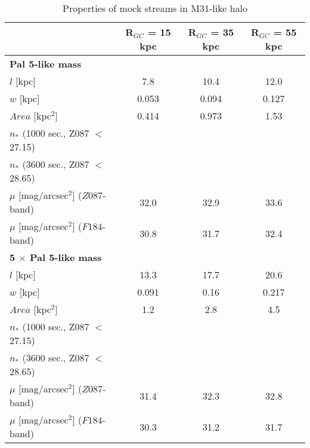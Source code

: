 \documentclass[twocolumn]{aastex62}
\begin{document}

\begin{table*}
\centering
\caption{Properties of mock streams in M31-like halo}
\label{tab:Pal5}
\begin{tabular}{lccc}
\hline
 & {\bf R$_{GC}$ = 15 kpc }&  {\bf R$_{GC}$ = 35 kpc} &  {\bf R$_{GC}$ = 55 kpc} \\ 
 \hline
{\bf Pal 5-like mass} & &&\\
$l$ [kpc] & 7.8 & 10.4 &  12.0  \\
$w$ [kpc] & 0.053 & 0.094  & 0.127  \\
$Area$ [kpc$^2$] & 0.414 & 0.973 &1.53 \\
$n_*$ (1000 sec., Z087 $<$ 27.15) & & \\
$n_*$ (3600 sec., Z087 $<$ 28.65) & & \\
$\mu$ [mag/arcsec$^2$] ($Z087$-band) &32.0 &32.9 &33.6  \\
$\mu$ [mag/arcsec$^2$] ($F184$-band) &30.8 &31.7 &32.4  \\

\hline
{\bf 5 $\times$ Pal 5-like mass} & &&\\ 
$l$ [kpc] &13.3 & 17.7&20.6  \\
$w$ [kpc]& 0.091 &  0.16& 0.217  \\
$Area$ [kpc$^2$] & 1.2  &  2.8  &  4.5\\
$n_*$ (1000 sec., Z087 $<$ 27.15) & & \\
$n_*$ (3600 sec., Z087 $<$ 28.65) & & \\
$\mu$ [mag/arcsec$^2$] ($Z087$-band) & 31.4&  32.3& 32.8 \\
$\mu$ [mag/arcsec$^2$] ($F184$-band) &30.3 &31.2 &31.7  \\


\end{tabular}
\end{table*}
\end{document}
